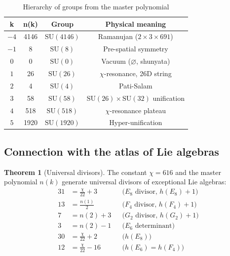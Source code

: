 \documentclass[12pt,a4paper,twoside]{article}
\newcommand{\SU}{\mathrm{SU}}
\theoremstyle{definition}
\newtheorem{theorem}{Theorem}[section]
\begin{document}
\begin{table}[H]
\centering
\small
\caption{Hierarchy of groups from the master polynomial}
\label{tab:hierarchy}
\begin{tabular}{c|c|c|c}
\toprule
\textbf{k} & \textbf{n(k)} & \textbf{Group} & \textbf{Physical meaning} \\
\midrule
$-4$ & 4146 & $\SU(4146)$ & Ramanujan ($2 \times 3 \times 691$) \\
$-1$ & 8 & $\SU(8)$ & Pre-spatial symmetry \\
$0$ & 0 & $\SU(0)$ & Vacuum ($\varnothing$, shunyata) \\
$1$ & 26 & $\SU(26)$ & $\chi$-resonance, 26D string \\
$2$ & 4 & $\SU(4)$ & Pati-Salam \\
$3$ & 58 & $\SU(58)$ & $\SU(26) \times \SU(32)$ unification \\
$4$ & 518 & $\SU(518)$ & $\chi$-resonance plateau \\
$5$ & 1920 & $\SU(1920)$ & Hyper-unification \\
\bottomrule
\end{tabular}
\end{table}

\subsection{Connection with the atlas of Lie algebras}

\begin{theorem}[Universal divisors]
The constant $\chi = 616$ and the master polynomial $n(k)$ generate universal divisors of exceptional Lie algebras:
\begin{equation}
\boxed{
\begin{aligned}
31 &= \frac{\chi}{22} + 3 && \text{($E_8$ divisor, $h(E_8) + 1$)} \\
13 &= \frac{n(1)}{2} && \text{($F_4$ divisor, $h(F_4) + 1$)} \\
7 &= n(2) + 3 && \text{($G_2$ divisor, $h(G_2) + 1$)} \\
3 &= n(2) - 1 && \text{($E_6$ determinant)} \\
30 &= \frac{\chi}{22} + 2 && \text{($h(E_8)$)} \\
12 &= \frac{\chi}{22} - 16 && \text{($h(E_6) = h(F_4)$)}
\end{aligned}
}
\label{eq:divisors}
\end{equation}
\end{theorem}
\end{document}

